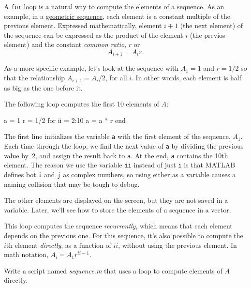 A \lstinline{for} loop is a natural way to compute the elements of a sequence. As an example, in a \href{https://en.wikipedia.org/wiki/Geometric_progression}{geometric sequence}, each element is a constant multiple of the previous element.  Expressed mathematically, element $i+1$ (the next element) of the sequence can be expressed as the product of the element $i$ (the previos element) and the constant \emph{common ratio}, $r$ or
\begin{equation*}
A_{i+1} = A_{i} r.
\end{equation*}

As a more specific example, let's
look at the sequence with $A_1 = 1$ and $r=1/2$ so that the relationship $A_{i+1} = A_i/2$, for all $i$.  In other words, each element is half as big as the one before it.

The following loop computes the first 10 elements of $A$:

\begin{code}
a = 1
r = 1/2
for ii = 2:10
    a = a * r
end
\end{code}

The first line initializes the variable \lstinline{a} with the first element of the sequence, $A_1$. Each time through the loop, we find the next value of \lstinline{a}
by dividing the previous value by~2, and assign the result back to \lstinline{a}.
At the end, \lstinline{a} contains the 10th element.  The reason we use the variable \lstinline{ii} instead of just \lstinline{i} is that MATLAB defines bot \lstinline{i} and \lstinline{j} as complex numbers, so using either as a variable causes a naming collision that may be tough to debug.

The other elements are displayed on the screen, but they are not saved in a variable.
Later, we'll see how to store the elements of a sequence in a vector.


This loop computes the sequence \emph{recurrently}, which means that each element depends on the previous one. For this sequence, it's also possible to compute the $i$th element \emph{directly}, as a function of $ii$, without using the previous element. In math notation, $A_i = A_1 r^{ii-1}$.

\begin{ex}
Write a script named \emph{sequence.m} that uses a loop to
compute elements of $A$ \mbox{directly}.
\end{ex}


